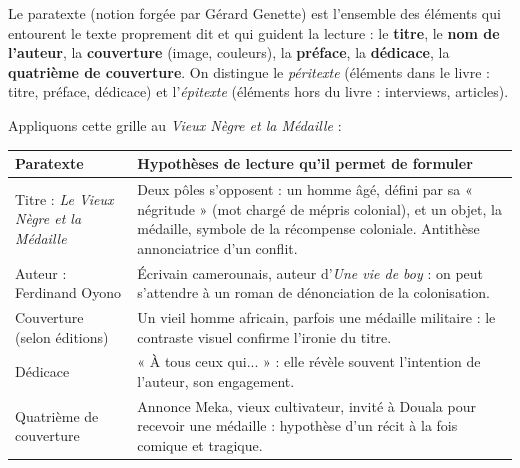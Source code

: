 \documentclass[11pt]{article}
\newcommand{\cle}[1]{{\popxbold\color{popdark}#1}}
\begin{document}
\begin{definition}[Le paratexte]
Le \cle{paratexte} (notion forgée par Gérard Genette) est l'ensemble des éléments qui entourent le texte proprement dit et qui guident la lecture : le \textbf{titre}, le \textbf{nom de l'auteur}, la \textbf{couverture} (image, couleurs), la \textbf{préface}, la \textbf{dédicace}, la \textbf{quatrième de couverture}. On distingue le \emph{péritexte} (éléments dans le livre : titre, préface, dédicace) et l'\emph{épitexte} (éléments hors du livre : interviews, articles).
\end{definition}

Appliquons cette grille au \emph{Vieux Nègre et la Médaille} :

\begin{center}
\begin{tabularx}{\linewidth}{|l|X|}
\hline
\rowcolor{popblueL} \textbf{Paratexte} & \textbf{Hypothèses de lecture qu'il permet de formuler} \\
\hline
Titre : \emph{Le Vieux Nègre et la Médaille} & Deux pôles s'opposent : un homme âgé, défini par sa « négritude » (mot chargé de mépris colonial), et un objet, la médaille, symbole de la récompense coloniale. Antithèse annonciatrice d'un conflit. \\
\hline
Auteur : Ferdinand Oyono & Écrivain camerounais, auteur d'\emph{Une vie de boy} : on peut s'attendre à un roman de dénonciation de la colonisation. \\
\hline
Couverture (selon éditions) & Un vieil homme africain, parfois une médaille militaire : le contraste visuel confirme l'ironie du titre. \\
\hline
Dédicace & « À tous ceux qui... » : elle révèle souvent l'intention de l'auteur, son engagement. \\
\hline
Quatrième de couverture & Annonce Meka, vieux cultivateur, invité à Douala pour recevoir une médaille : hypothèse d'un récit à la fois comique et tragique. \\
\hline
\end{tabularx}
\end{center}
\end{document}
